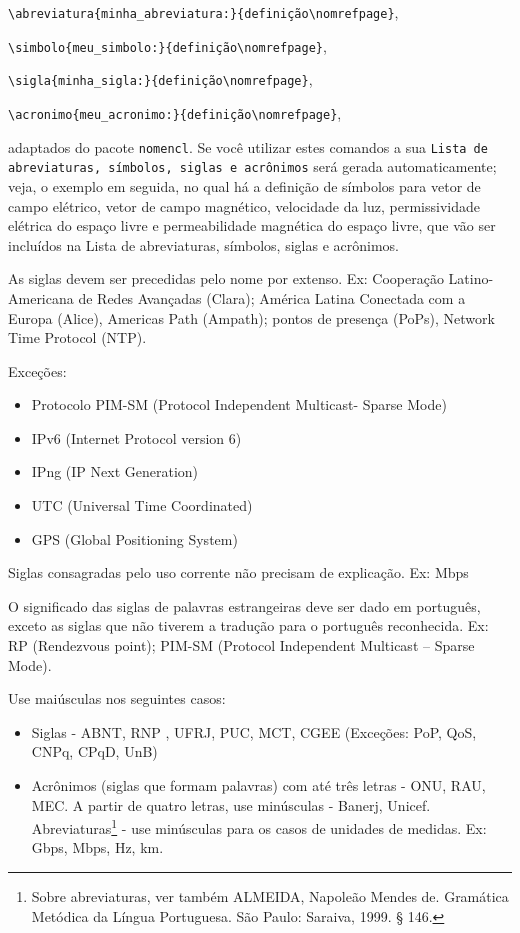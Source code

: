 \noindent\verb|\abreviatura{minha_abreviatura:}{definição\nomrefpage}|,

\noindent\verb|\simbolo{meu_simbolo:}{definição\nomrefpage}|,

\noindent\verb|\sigla{minha_sigla:}{definição\nomrefpage}|,

\noindent\verb|\acronimo{meu_acronimo:}{definição\nomrefpage}|,

\noindent adaptados do pacote \texttt{nomencl}. Se você utilizar estes comandos a sua \texttt{Lista de abreviaturas, símbolos, siglas e acrônimos} será gerada automaticamente; veja, o exemplo em seguida, no qual há a definição de símbolos para vetor de campo elétrico, vetor de campo magnético, velocidade da luz, permissividade elétrica do espaço livre e permeabilidade magnética do espaço livre, que vão ser incluídos na Lista de abreviaturas, símbolos, siglas e acrônimos.

As siglas devem ser precedidas pelo nome por extenso. Ex: Cooperação Latino-Americana de Redes Avançadas (Clara); América Latina Conectada com a Europa (Alice), Americas Path (Ampath); pontos de presença (PoPs), Network Time Protocol (NTP).

Exceções:
\begin{itemize}
\item Protocolo PIM-SM (Protocol Independent Multicast- Sparse Mode)
\item IPv6 (Internet Protocol version 6)
\item IPng (IP Next Generation)
\item UTC (Universal Time Coordinated)
\item GPS (Global Positioning System)
\end{itemize}

Siglas consagradas pelo uso corrente não precisam de explicação. Ex: Mbps

O significado das siglas de palavras estrangeiras deve ser dado em português, exceto as siglas que não tiverem a tradução para o português reconhecida. Ex: RP (Rendezvous point); PIM-SM (Protocol Independent Multicast – Sparse Mode).

Use maiúsculas nos seguintes casos:

\begin{itemize}
\item Siglas - ABNT, RNP , UFRJ, PUC, MCT, CGEE (Exceções: PoP, QoS, CNPq, CPqD, UnB)
\item Acrônimos (siglas que formam palavras) com até três letras - ONU, RAU, MEC. A partir de quatro letras, use minúsculas - Banerj, Unicef.
Abreviaturas\footnote[1]{Sobre abreviaturas, ver também ALMEIDA, Napoleão Mendes de. Gramática Metódica da Língua Portuguesa. São Paulo: Saraiva, 1999. § 146.}
 - use minúsculas para os casos de unidades de medidas. Ex: Gbps, Mbps, Hz, km.
\end{itemize}


